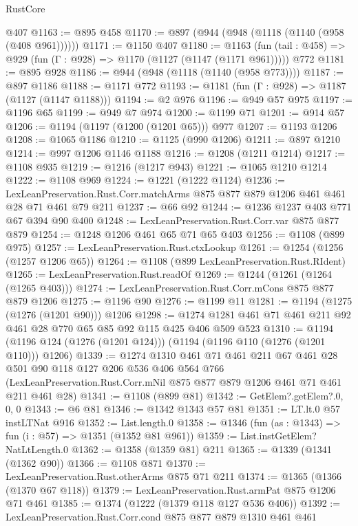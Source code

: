 \begin{lexlean}{RustCore}
\begin{coremodule}
    @407
@1163 := @895 @458
@1170 := @897 (@944 (@948 (@1118 (@1140 (@958 (@408 @961))))))
@1171 := @1150 @407
@1180 := @1163
    (fun (tail : @458) => @929 (fun (Γ : @928) => @1170 (@1127 (@1147 (@1171 @961)))))
    @772
@1181 := @895 @928
@1186 := @944 (@948 (@1118 (@1140 (@958 @773))))
@1187 := @897 @1186
@1188 := @1171 @772
@1193 := @1181 (fun (Γ : @928) => @1187 (@1127 (@1147 @1188)))
@1194 := @2 @976
@1196 := @949 @57 @975
@1197 := @1196 @65
@1199 := @949 @7 @974
@1200 := @1199 @71
@1201 := @914 @57
@1206 := @1194 (@1197 (@1200 (@1201 @65))) @977
@1207 := @1193 @1206
@1208 := @1065 @1186
@1210 := @1125 (@990 @1206)
@1211 := @897 @1210
@1214 := @997 @1206 @1146 @1188
@1216 := @1208 (@1211 @1214)
@1217 := @1108 @935
@1219 := @1216 (@1217 @943)
@1221 := @1065 @1210 @1214
@1222 := @1108 @969
@1224 := @1221 (@1222 @1124)
@1236 := LexLeanPreservation.Rust.Corr.matchArms
    @875
    @877
    @879
    @1206
    @461
    @461
    @28
    @71
    @461
    @79
    @211
@1237 := @66 @92
@1244 := @1236 @1237 @403 @771 @67 @394 @90 @400
@1248 := LexLeanPreservation.Rust.Corr.var @875 @877 @879
@1254 := @1248 @1206 @461 @65 @71 @65 @403
@1256 := @1108 (@899 @975)
@1257 := LexLeanPreservation.Rust.ctxLookup
@1261 := @1254 (@1256 (@1257 @1206 @65))
@1264 := @1108 (@899 LexLeanPreservation.Rust.RIdent)
@1265 := LexLeanPreservation.Rust.readOf
@1269 := @1244 (@1261 (@1264 (@1265 @403)))
@1274 := LexLeanPreservation.Rust.Corr.mCons @875 @877 @879 @1206
@1275 := @1196 @90
@1276 := @1199 @11
@1281 := @1194 (@1275 (@1276 (@1201 @90))) @1206
@1298 := @1274 @1281 @461 @71 @461 @211 @92 @461 @28 @770 @65 @85 @92 @115 @425 @406 @509 @523
@1310 := @1194 (@1196 @124 (@1276 (@1201 @124))) (@1194 (@1196 @110 (@1276 (@1201 @110))) @1206)
@1339 := @1274
    @1310
    @461
    @71
    @461
    @211
    @67
    @461
    @28
    @501
    @90
    @118
    @127
    @206
    @536
    @406
    @564
    @766
    (LexLeanPreservation.Rust.Corr.mNil @875 @877 @879 @1206 @461 @71 @461 @211 @461 @28)
@1341 := @1108 (@899 @81)
@1342 := GetElem?.getElem?.{0, 0, 0}
@1343 := @6 @81
@1346 := @1342 @1343 @57 @81
@1351 := LT.lt.{0} @57 instLTNat @916
@1352 := List.length.{0}
@1358 := @1346 (fun (as : @1343) => fun (i : @57) => @1351 (@1352 @81 @961))
@1359 := List.instGetElem?NatLtLength.{0}
@1362 := @1358 (@1359 @81) @211
@1365 := @1339 (@1341 (@1362 @90))
@1366 := @1108 @871
@1370 := LexLeanPreservation.Rust.otherArms @875 @71 @211
@1374 := @1365 (@1366 (@1370 @67 @118))
@1379 := LexLeanPreservation.Rust.armPat @875 @1206 @71 @461
@1385 := @1374 (@1222 (@1379 @118 @127 @536 @406))
@1392 := LexLeanPreservation.Rust.Corr.cond @875 @877 @879 @1310 @461 @461

\end{coremodule}
\end{lexlean}
